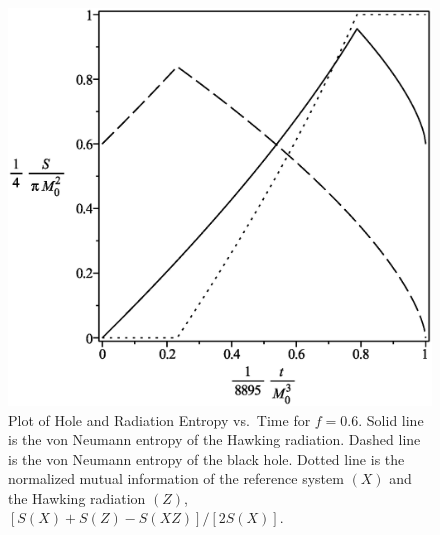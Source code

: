 \documentclass[12pt]{article}
\begin{document}
\begin{figure}[H]
\centering
\includegraphics[width=1\textwidth]{Hawking-hole-radiation-mutual-entropy-vs-time-graph-10f-is-6.eps}
\caption{Plot of Hole and Radiation Entropy vs.\ Time for $f=0.6$.
Solid line is the von Neumann entropy of the Hawking radiation.
Dashed line is the von Neumann entropy of the black hole.
Dotted line is the normalized mutual information of the reference system $(X)$ and the Hawking radiation $(Z)$, $[S(X)+S(Z)-S(XZ)]/[2S(X)]$.}
\end{figure}
\end{document}

